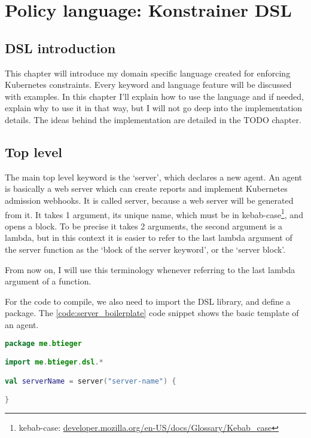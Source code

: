 \setlength{\parindent}{0pt}
\setlength{\parskip}{0.6em}

\chapter[Policy language]{Policy language: Konstrainer DSL}
\label{chap:konst_dsl}

\section{DSL introduction}

This chapter will introduce my domain specific language created for enforcing Kubernetes constraints. Every keyword and language feature will be discussed with examples. In this chapter I'll explain how to use the language and if needed, explain why to use it in that way, but I will not go deep into the implementation details. The ideas behind the implementation are detailed in the TODO chapter.

\section{Top level}

The main top level keyword is the `server', which declares a new agent. An agent is basically a web server which can create reports and implement Kubernetes admission webhooks. It is called server, because a web server will be generated from it. It takes 1 argument, its unique name, which must be in kebab-case\footnote{kebab-case: \url{developer.mozilla.org/en-US/docs/Glossary/Kebab_case}}, and opens a block. To be precise it takes 2 arguments, the second argument is a lambda, but in this context it is easier to refer to the last lambda argument of the server function as the `block of the server keyword', or the `server block'.

From now on, I will use this terminology whenever referring to the last lambda argument of a function.

For the code to compile, we also need to import the DSL library, and define a package. The \ref{code:server_boilerplate} code snippet shows the basic template of an agent.

\begin{lstlisting}[caption={Template of a DSL file},language=Kotlin,label=code:server_boilerplate]
package me.btieger

import me.btieger.dsl.*

val serverName = server("server-name") {

}
\end{lstlisting}

